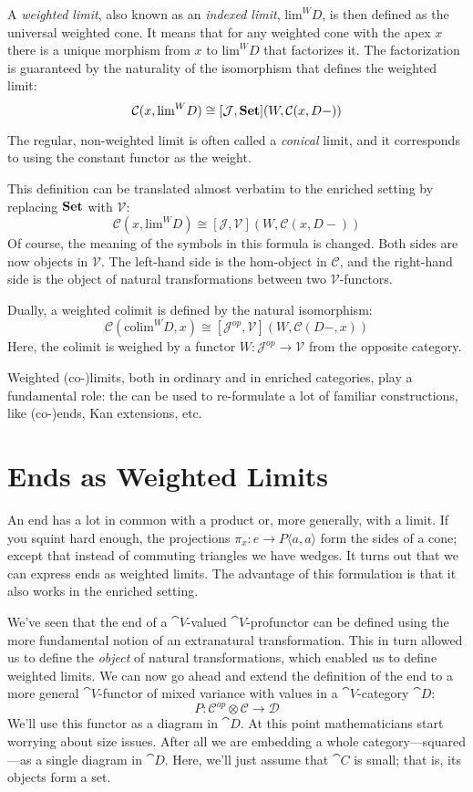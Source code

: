 \documentclass[DaoFP]{subfiles}
\begin{document}
A \emph{weighted limit}, also known as an \emph{indexed limit}, $\text{lim}^W D$, is then defined as the universal weighted cone. It means that for any weighted cone with the apex $x$ there is a unique morphism from $x$ to $\text{lim}^W D$ that factorizes it. The factorization is guaranteed by the naturality of the isomorphism that defines the weighted limit:
\[  \mathcal C(x, \text{lim}^W D) \cong [\mathcal J, \mathbf{Set}] (W, \mathcal C(x, D-)) \]

The regular, non-weighted limit is often called a \emph{conical} limit, and it corresponds to using the constant functor as the weight. 

This definition can be translated almost verbatim to the enriched setting by replacing $\mathbf{Set}$ with $\mathcal V$:
\[  \mathcal C(x, \text{lim}^W D) \cong [\mathcal J, \mathcal V] (W, \mathcal C(x, D-)) \]
Of course, the meaning of the symbols in this formula is changed. Both sides are now objects in $\mathcal V$. The left-hand side is the hom-object in $\mathcal C$, and the right-hand side is the object of natural transformations between two $\mathcal V$-functors.

Dually, a weighted colimit is defined by the natural isomorphism:
\[  \mathcal C(\text{colim}^W D, x) \cong [\mathcal J^{op}, \mathcal V] (W, \mathcal C(D-, x)) \]
Here, the colimit is weighed by a functor $W \colon \mathcal J^{op} \to \mathcal V$ from the opposite category.

Weighted (co-)limits, both in ordinary and in enriched categories, play a fundamental role: the can be used to re-formulate a lot of familiar constructions, like (co-)ends, Kan extensions, etc. 

\section{Ends as Weighted Limits}

An end has a lot in common with a product or, more generally, with a limit. If you squint hard enough, the projections $\pi_x \colon e \to P \langle a, a \rangle$ form the sides of a cone; except that instead of commuting triangles we have wedges. It turns out that we can express ends as weighted limits. The advantage of this formulation is that it also works in the enriched setting. 

We've seen that the end of a $\cat V$-valued $\cat V$-profunctor can be defined using the more fundamental notion of an extranatural transformation. This in turn allowed us to define the \emph{object} of natural transformations, which enabled us to define weighted limits. We can now go ahead and extend the definition of the end to a more general $\cat V$-functor of mixed variance with values in a $\cat V$-category $\cat D$:
\[ P \colon \mathcal C^{op} \otimes \mathcal C \to \mathcal D \]
We'll use this functor as a diagram in $\cat D$. At this point mathematicians start worrying about size issues. After all we are embedding a whole category---squared---as a single diagram in $\cat D$. Here, we'll just assume that $\cat C$ is small; that is, its objects form a set. 
\end{document}
